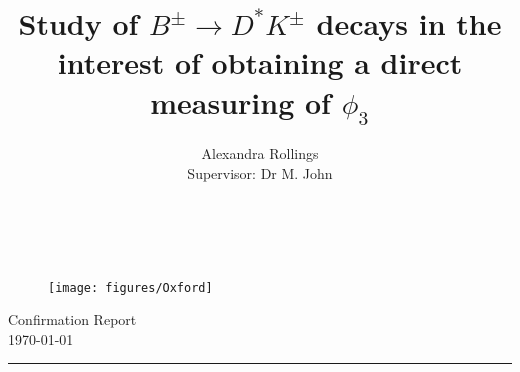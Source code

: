 \documentclass[oneside,12pt]{article}
\title{
      \LARGE \textbf{Study of $B^{\pm} \rightarrow D^{*}K^{\pm}$ decays in the interest of obtaining a direct measuring of $\phi_3$} \\
		}
\author{
		Alexandra Rollings\\	
		Supervisor: Dr M. John\\	
}
\makeatletter
\newcommand{\HRule}[1]{\rule{\linewidth}{#1}}     %
\def\printtitle{%
  {\centering \@title\par}}
\def\printauthor{%
  {\centering \large \@author}}
\makeatother
\begin{document}
\begin{titlepage}
\begin{nolinenumbers}
\thispagestyle{empty} 
\begin{figure}[H]
  \texttt{[image: figures/Oxford]}
\end{figure}
\begin{flushright}
\normalsize {Confirmation Report} 	%
\\ \normalsize \today			%
\end{flushright}
\HRule{0.5pt} \\						%
[2.0cm]
\printtitle 
\vspace{75pt}
\printauthor
\vfill
\begin{abstract}
\noindent
\\
\end{abstract}
\vfill
\end{nolinenumbers}
\end{titlepage}
\setcounter{page}{1}
\end{document}
